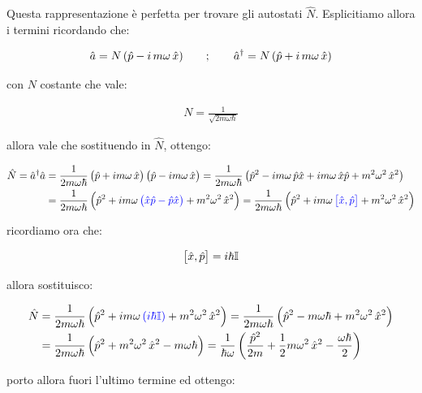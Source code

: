 	Questa rappresentazione è perfetta per trovare gli autostati $\hat{N}$. Esplicitiamo allora i termini ricordando che:
	
\begin{align*}
	\hat{a} = N \, \qty(\hat{p} - i\, m\omega \, \hat{x}) \qquad ; \qquad \hat{a}^{\dagger} = N \, \qty(\hat{p} + i\, m\omega \, \hat{x})
\end{align*}

	con $N$ costante che vale:
	
\begin{align*}
	N = \frac{1}{\sqrt{2m\omega \hbar}}
\end{align*}

	allora vale che sostituendo in $\hat{N}$, ottengo:
	
\begin{align*}
	\hat{N} = \hat{a}^{\dagger}\hat{a} & = \frac{1}{2m\omega \hbar} \, \qty\big(\hat{p} + im\omega \, \hat{x}) \,  \qty\big(\hat{p} - im\omega \, \hat{x}) = \frac{1}{2m\omega \hbar} \, \qty\big( \hat{p}^2 - im\omega \, \hat{p}\hat{x} + im\omega \, \hat{x}\hat{p} + m^2\omega^2 \, \hat{x}^2) \\
	& = \frac{1}{2m\omega \hbar} \, \qty\Big( \hat{p}^2  + im\omega \,\textcolor{blue}{\qty\big( \hat{x}\hat{p} - \hat{p}\hat{x})} + m^2\omega^2 \, \hat{x}^2) = \frac{1}{2m\omega \hbar} \, \qty\Big( \hat{p}^2  + im\omega \,\textcolor{blue}{\qty\big[ \hat{x}, \hat{p}]} + m^2\omega^2 \, \hat{x}^2)
\end{align*}
	
	ricordiamo ora che:
	
\begin{align*}
	\qty\big[\hat{x}, \hat{p}] = i\hbar \mathbb{I}
\end{align*}

	allora sostituisco:

\begin{align*}
	\hat{N} & = \frac{1}{2m\omega \hbar} \, \qty\Big( \hat{p}^2  + im\omega \,\textcolor{blue}{\qty(i\hbar \mathbb{I})} + m^2\omega^2 \, \hat{x}^2) = \frac{1}{2m\omega \hbar} \, \qty\Big( \hat{p}^2  - m\omega\hbar + m^2\omega^2 \, \hat{x}^2) \\
	& = \frac{1}{2m\omega \hbar} \, \qty\Big( \hat{p}^2 + m^2\omega^2 \, \hat{x}^2 - m\omega\hbar ) = \frac{1}{\hbar \omega} \, \qty(\frac{\hat{p}^2}{2m} + \frac{1}{2}m\omega^2 \, \hat{x}^2 - \frac{\omega\hbar}{2})  
\end{align*}

	porto allora fuori l'ultimo termine ed ottengo:
	
